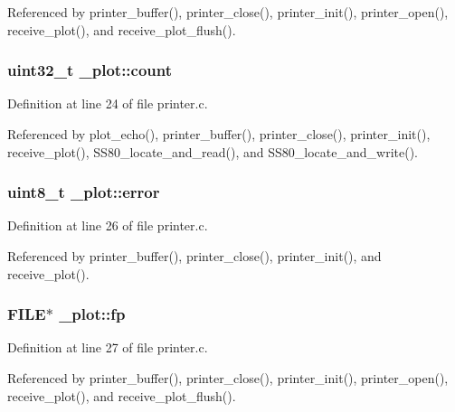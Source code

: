 Referenced by printer\-\_\-buffer(), printer\-\_\-close(), printer\-\_\-init(), printer\-\_\-open(), receive\-\_\-plot(), and receive\-\_\-plot\-\_\-flush().

\hypertarget{struct__plot_af4d84e2aa52eabdc7ccc2fbf18272e98}{
\subsubsection[{count}]{\setlength{\rightskip}{0pt plus 5cm}uint32\-\_\-t \-\_\-plot\-::count}}\label{struct__plot_af4d84e2aa52eabdc7ccc2fbf18272e98}


Definition at line 24 of file printer.\-c.



Referenced by plot\-\_\-echo(), printer\-\_\-buffer(), printer\-\_\-close(), printer\-\_\-init(), receive\-\_\-plot(), S\-S80\-\_\-locate\-\_\-and\-\_\-read(), and S\-S80\-\_\-locate\-\_\-and\-\_\-write().

\hypertarget{struct__plot_a9a9516230fefbc6cdd6e4ca5d6403509}{
\subsubsection[{error}]{\setlength{\rightskip}{0pt plus 5cm}uint8\-\_\-t \-\_\-plot\-::error}}\label{struct__plot_a9a9516230fefbc6cdd6e4ca5d6403509}


Definition at line 26 of file printer.\-c.



Referenced by printer\-\_\-buffer(), printer\-\_\-close(), printer\-\_\-init(), and receive\-\_\-plot().

\hypertarget{struct__plot_aec1bc5aae9d9c56584ee0cbb31515ac6}{
\subsubsection[{fp}]{\setlength{\rightskip}{0pt plus 5cm}F\-I\-L\-E$\ast$ \-\_\-plot\-::fp}}\label{struct__plot_aec1bc5aae9d9c56584ee0cbb31515ac6}


Definition at line 27 of file printer.\-c.



Referenced by printer\-\_\-buffer(), printer\-\_\-close(), printer\-\_\-init(), printer\-\_\-open(), receive\-\_\-plot(), and receive\-\_\-plot\-\_\-flush().

